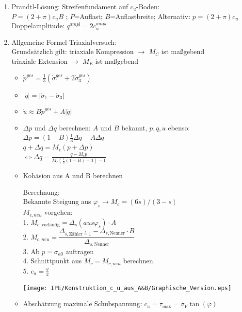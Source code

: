\documentclass[fleqn,twoside]{article}
\newcommand{\abs}[1]{\ensuremath{\left\vert#1\right\vert}}
\begin{document}
\begin{enumerate}
\item Prandtl-Lösung: Streifenfundament auf $c_u$-Boden:\\
		$P=(2+\pi)c_u B$ ; $P$=Auflast; $B$=Auflastbreite; Alternativ: $p=(2+\pi)c_u$\\
		Doppelamplitude: $q^{ampl}=2c^{ampl}_u$
\item 	Allgemeine Formel Triaxialversuch:\\
		Grundsätzlich gilt: triaxiale Kompression $\rightarrow$ $M_C$ ist maßgebend\\
		\phantom{Grundsätzlich gilt:} triaxiale Extension $\rightarrow$ $M_E$ ist maßgebend
		\begin{itemize}
		\item $\dot{p}^{ges}=\frac{1}{3}(\dot{\sigma}_1^{ges}+2\dot{\sigma}_3^{ges})$
		\item $\abs{\dot{q}}=\abs{\dot{\sigma}_1-\dot{\sigma}_3}$
		\item $\dot{u}\approx B\dot{p}^{ges}+A \abs{\dot{q}}$
		\item $\Delta p$ und $\Delta q$ berechnen: $A$ und $B$ bekannt, $p,q,u$ ebenso:\\
		$\Delta p = (1-B) \frac{1}{3} \Delta q-A\Delta q$\\
		$q+ \Delta q = M_c(p+\Delta p)$\\
		$\boxed{\Leftrightarrow \Delta q=\frac{q-M_cp}{M_c\left(\frac13(1-B)-1\right)-1}}$
		\item Kohäsion aus A und B berechnen\\ 
		\begin{minipage}{0.5\textwidth}
		Berechnung:\\
		Bekannte Steigung aus $\varphi_s \rightarrow M_c=(6s)/(3-s)$\\
		$M_{c,neu}$ vorgehen:\\ 
		1. $M_{c,\text{vorläufig}} = \Delta_{s}(aus \varphi_s) \cdot A$\\ 
		2. $M_{c,neu} = \dfrac{\Delta_{s,\text{Zähler} \overset{!}{=} 1} - \Delta_{s,\text{Nenner}} \cdot B}{\Delta_{s,\text{Nenner}}}$\\
		3. Ab $p = \sigma_{a0}$ auftragen\\
		4. Schnittpunkt aus $M_c = M_{c,neu}$ berechnen.\\
		5. $c_u = \frac{q}{2}$ 
		\end{minipage}		
		\begin{minipage}{0.5\textwidth}
		\texttt{[image: IPE/Konstruktion\_c\_u\_aus\_A\&B/Graphische\_Version.eps]}
		\end{minipage}
		\item Abschätzung maximale Schubspannung: $c_u = \tau_{\max} = \sigma_V \tan(\varphi)$\\

\end{itemize}
\end{enumerate}
\end{document}
